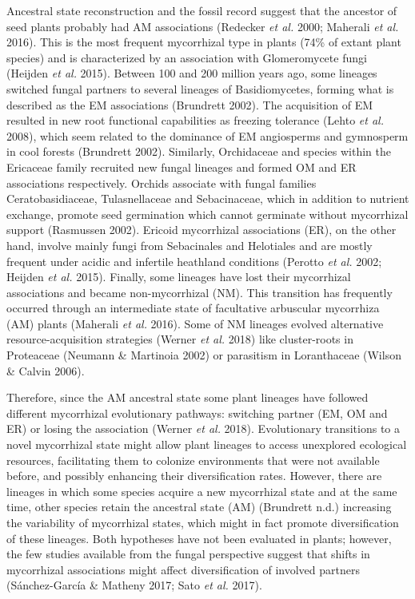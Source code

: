 \documentclass[12pt,]{article}
\begin{document}
Ancestral state reconstruction and the fossil record suggest that the
ancestor of seed plants probably had AM associations (Redecker \emph{et
al.} 2000; Maherali \emph{et al.} 2016). This is the most frequent
mycorrhizal type in plants (74\% of extant plant species) and is
characterized by an association with Glomeromycete fungi (Heijden
\emph{et al.} 2015). Between 100 and 200 million years ago, some
lineages switched fungal partners to several lineages of Basidiomycetes,
forming what is described as the EM associations (Brundrett 2002). The
acquisition of EM resulted in new root functional capabilities as
freezing tolerance (Lehto \emph{et al.} 2008), which seem related to the
dominance of EM angiosperms and gymnosperm in cool forests (Brundrett
2002). Similarly, Orchidaceae and species within the Ericaceae family
recruited new fungal lineages and formed OM and ER associations
respectively. Orchids associate with fungal families Ceratobasidiaceae,
Tulasnellaceae and Sebacinaceae, which in addition to nutrient exchange,
promote seed germination which cannot germinate without mycorrhizal
support (Rasmussen 2002). Ericoid mycorrhizal associations (ER), on the
other hand, involve mainly fungi from Sebacinales and Helotiales and are
mostly frequent under acidic and infertile heathland conditions (Perotto
\emph{et al.} 2002; Heijden \emph{et al.} 2015). Finally, some lineages
have lost their mycorrhizal associations and became non-mycorrhizal
(NM). This transition has frequently occurred through an intermediate
state of facultative arbuscular mycorrhiza (AM) plants (Maherali
\emph{et al.} 2016). Some of NM lineages evolved alternative
resource-acquisition strategies (Werner \emph{et al.} 2018) like
cluster-roots in Proteaceae (Neumann \& Martinoia 2002) or parasitism in
Loranthaceae (Wilson \& Calvin 2006).

Therefore, since the AM ancestral state some plant lineages have
followed different mycorrhizal evolutionary pathways: switching partner
(EM, OM and ER) or losing the association (Werner \emph{et al.} 2018).
Evolutionary transitions to a novel mycorrhizal state might allow plant
lineages to access unexplored ecological resources, facilitating them to
colonize environments that were not available before, and possibly
enhancing their diversification rates. However, there are lineages in
which some species acquire a new mycorrhizal state and at the same time,
other species retain the ancestral state (AM) (Brundrett n.d.)
increasing the variability of mycorrhizal states, which might in fact
promote diversification of these lineages. Both hypotheses have not been
evaluated in plants; however, the few studies available from the fungal
perspective suggest that shifts in mycorrhizal associations might affect
diversification of involved partners (Sánchez-García \& Matheny 2017;
Sato \emph{et al.} 2017).
\end{document}
